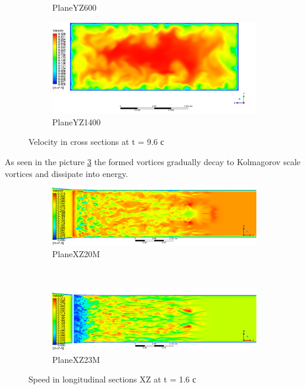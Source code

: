 \begin{figure}[H]
\begin{subfigure}{.5\textwidth}
			\caption{PlaneYZ600}
			\label{fig:T96VelocityContourYZ600}
		\end{subfigure}%
		\begin{subfigure}{.5\textwidth}
			\centering
			\includegraphics[width=1.1\linewidth]{../Assets/T96_Velocity_ContourYZ1400}
			\caption{PlaneYZ1400}
			\label{fig:T96VelocityContourYZ1400}
		\end{subfigure}
		\caption{Velocity in cross sections at t = 9.6 с}
		\label{fig:T96VelocityContourYZ}
	\end{figure}
	As seen in the picture \ref{fig:T96VelocityContourYZ} the formed vortices gradually decay to Kolmagorov scale vortices and dissipate into energy.
	
	\begin{figure}[H]
		\begin{subfigure}{1\textwidth}
			\centering
			\includegraphics[width=1\linewidth]{../Assets/T16_Velocity_ContourXZ20M}
			\caption{PlaneXZ20M}
			\label{fig:T16VelocityContourXZ20M}
		\end{subfigure}%
		\\
		\begin{subfigure}{1\textwidth}
			\centering
			\includegraphics[width=1\linewidth]{../Assets/T16_Velocity_ContourXZ23M}
			\caption{PlaneXZ23M}
			\label{fig:T16VelocityContourXZ23M}
		\end{subfigure}
		\caption{Speed in longitudinal sections XZ at t = 1.6 с}
		\label{fig:T16VelocityContourXZ}
	\end{figure}
